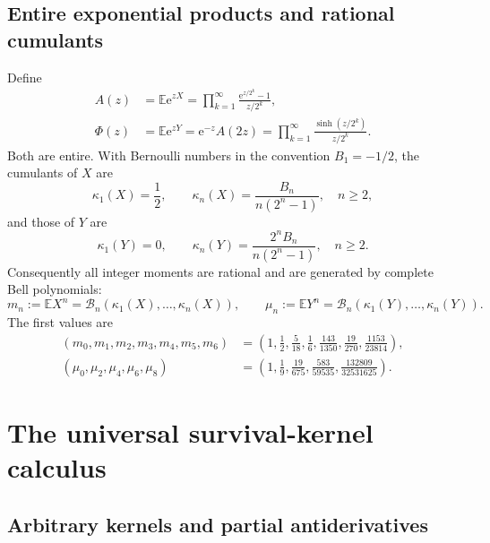\documentclass[11pt,oneside]{article}
\theoremstyle{definition}
\theoremstyle{remark}
\newcommand{\E}{\mathbb E}
\newcommand{\e}{\mathrm e}
\newcommand{\1}{\mathbf 1}
\begin{document}
\subsection{Entire exponential products and rational cumulants}

Define
\begin{align}
 A(z)&=\E\e^{zX}
 =\prod_{k=1}^{\infty}\frac{\e^{z/2^k}-1}{z/2^k},
 \label{p8:eq:Aproduct}\\
 \Phi(z)&=\E\e^{zY}
 =\e^{-z}A(2z)
 =\prod_{k=1}^{\infty}\frac{\sinh(z/2^k)}{z/2^k}.
 \label{p8:eq:PhiProduct}
\end{align}
Both are entire.  With Bernoulli numbers in the convention \(B_1=-1/2\), the
cumulants of \(X\) are
\begin{equation}
 \kappa_1(X)=\frac12,
 \qquad
 \boxed{\kappa_n(X)=\frac{B_n}{n(2^n-1)},\quad n\ge2,}
 \label{p8:eq:Xcumulants}
\end{equation}
and those of \(Y\) are
\begin{equation}
 \kappa_1(Y)=0,
 \qquad
 \boxed{\kappa_n(Y)=\frac{2^nB_n}{n(2^n-1)},\quad n\ge2.}
 \label{p8:eq:Ycumulants}
\end{equation}
Consequently all integer moments are rational and are generated by complete
Bell polynomials:
\begin{equation}
 m_n:=\E X^n=\mathcal B_n(\kappa_1(X),\ldots,\kappa_n(X)),
 \qquad
 \mu_n:=\E Y^n=\mathcal B_n(\kappa_1(Y),\ldots,\kappa_n(Y)).
 \label{p8:eq:BellMoments}
\end{equation}
The first values are
\begin{align}
 (m_0,m_1,m_2,m_3,m_4,m_5,m_6)
 &=\left(1,\frac12,\frac5{18},\frac16,\frac{143}{1350},
 \frac{19}{270},\frac{1153}{23814}\right),
 \label{p8:eq:XmomentsLow}\\
 (\mu_0,\mu_2,\mu_4,\mu_6,\mu_8)
 &=\left(1,\frac19,\frac{19}{675},\frac{583}{59535},
 \frac{132809}{32531625}\right).
 \label{p8:eq:YmomentsLow}
\end{align}

\section{The universal survival-kernel calculus}
\label{p8:sec:survival}

\subsection{Arbitrary kernels and partial antiderivatives}
\end{document}
